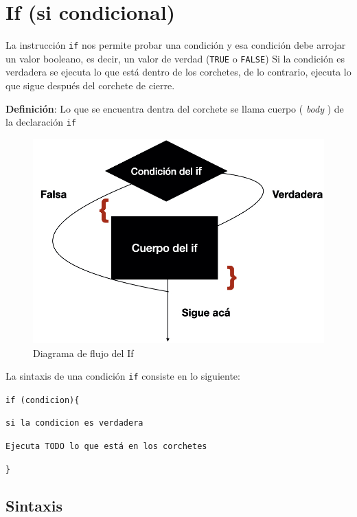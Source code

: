\documentclass[
]{book}
\begin{document}
\hypertarget{if-si-condicional}{%
\section{If (si condicional)}\label{if-si-condicional}}

La instrucción \texttt{if} nos permite probar una condición y esa condición debe arrojar un valor booleano, es decir, un valor de verdad (\texttt{TRUE} o \texttt{FALSE}) Si la condición es verdadera se ejecuta lo que está dentro de los corchetes, de lo contrario, ejecuta lo que sigue después del corchete de cierre.

\textbf{Definición}: Lo que se encuentra dentra del corchete se llama cuerpo ( \emph{body} ) de la declaración \texttt{if}

\begin{figure}
\hypertarget{id}{%
\centering
\includegraphics[width=1\textwidth,height=1\textheight]{If_R.001.jpeg}
\caption{Diagrama de flujo del If}\label{id}
}
\end{figure}

La sintaxis de una condición \texttt{if} consiste en lo siguiente:

\texttt{if\ (condicion)\{}

\texttt{si\ la\ condicion\ es\ verdadera}

\texttt{Ejecuta\ TODO\ lo\ que\ está\ en\ los\ corchetes}

\texttt{\}}

\hypertarget{sintaxis}{%
\subsection{Sintaxis}\label{sintaxis}}
\end{document}
